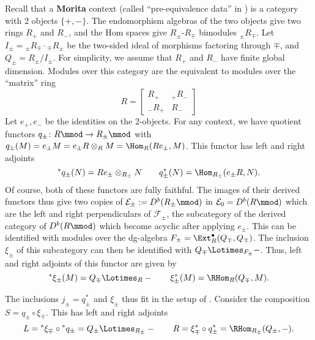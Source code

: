 Recall that a {\bf Morita} context (called ``pre-equivalence data'' in \cite{BassK}) is a category with 2 objects $\{+,-\}$.  The endomorphism algebras of the two objects give two rings $R_+$ and $R_-$, and the Hom spaces give  $R_\pm$-$R_\mp$ bimodules ${}_{\pm}R_\mp$.  Let $I_\pm={}_\pm R_\mp\cdot {}_\mp R_\pm$ be the two-sided ideal of morphisms factoring through $\mp$, and $Q_\pm=R_{\pm}/I_{\pm}$.  For simplicity, we assume that $R_+$ and $R_-$ have finite global dimension. Modules over this category are the equivalent to modules over the ``matrix'' ring \[R=
\begin{bmatrix}
  R_+ & {}_+R_-\\
   {}_-R_+ & R_-
 \end{bmatrix}\]
Let $e_+,e_-$ be the identities on the 2-objects. For any context, we have quotient functors $q_{\pm}\colon R\mmod \to R_{\pm}\mmod$ with $q_{\pm}(M)=e_{\pm}M=e_{\pm}R\otimes_RM=\Hom_{R}(Re_{\pm},M)$.  This functor has left and right adjoints \[{}^*q_{\pm}(N)=Re_{\pm}\otimes_{R_{\pm}}N\qquad q_{\pm}^*(N)=\Hom_{R_{\pm}}(e_{\pm}R,N).\]  Of course, both of these functors are fully faithful.  The images of their derived functors thus give two copies of $\mathcal{E}_{\pm}:=D^b(R_{\pm}\mmod)$ in $\mathcal{E}_0 =D^b(R\mmod)$ which are the left and right perpendiculars of $\mathcal{F}_{\pm}$, the subcategory of the derived category of $D^b(R\mmod)$ which become acyclic after applying $e_{\pm}$.  This can be identified with modules over the dg-algebra $F_{\pm}=\Ext_R^\bullet(Q_{\mp},Q_{\mp})$.  The inclusion $\xi_{\pm}$ of this subcategory can then be identified with $Q_{\mp}\Lotimes_{F_{\pm}}-$.  Thus, left and right adjoints of this functor are given by \[{}^*\xi_{\pm}(M)=Q_{\mp}\Lotimes_{R}-\qquad \xi_{\pm}^*(M)=\RHom_{R}(Q_{\mp}, M).\]

The inclusions $j_{\pm}=q_{\pm}^*$ and $\xi_{\pm}$ thus fit in the setup of \cite[\S 3.C]{KSschobers}.  Consider the composition $S=q_{\pm}\circ \xi_{\mp}$.  This has left and right adjoints \[L={}^*\xi_{\mp}\circ {}^*q_{\pm} =Q_{\pm}\Lotimes_{R_{\pm}}- \qquad R=\xi_{\mp} ^*\circ q_{\pm}^*= \RHom_{R_{\pm}}(Q_{\pm}, -).  \]



